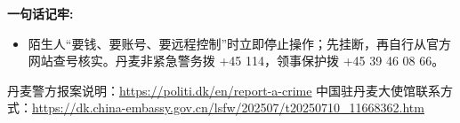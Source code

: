 \begin{grayleftbox}\textbf{一句话记牢: }
\begin{itemize}
    \item {陌生人“要钱、要账号、要远程控制”时立即停止操作；先挂断，再自行从官方网站查号核实。丹麦非紧急警务拨 +45 114，领事保护拨 +45 39 46 08 66。}
\end{itemize}
\end{grayleftbox}

丹麦警方报案说明：\url{https://politi.dk/en/report-a-crime}\quad
中国驻丹麦大使馆联系方式：\url{https://dk.china-embassy.gov.cn/lsfw/202507/t20250710_11668362.htm}



